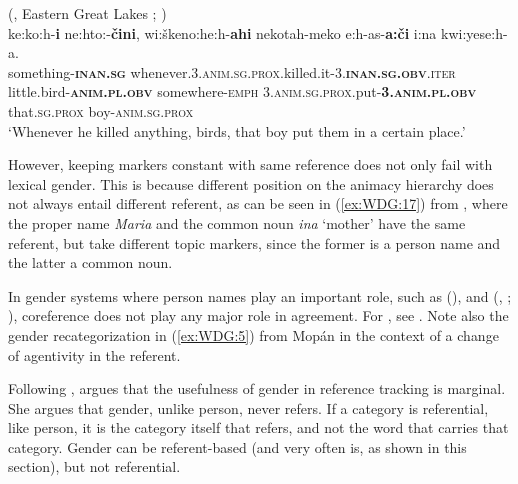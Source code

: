 \documentclass[output=collectionpaper]{langsci/langscibook}
\begin{document}
\ea\label{ex:WDG:16}
 (, Eastern Great Lakes ; \citealt[380]{Thomason2003})\\
\gll ke:ko:h-\textbf{i}	ne:hto:-\textbf{čini}, wi:škeno:he:h-\textbf{ahi} nekotah-meko e:h-as-\textbf{a:či}	i:na	kwi:yese:h-a.\\
something-\textbf{\textsc{inan.sg}}	whenever.3.\textsc{anim.sg.prox}.killed.it-3.\textbf{\textsc{inan.sg.obv}}.\textsc{iter} little.bird-\textbf{\textsc{anim.pl.obv}} 	somewhere-\textsc{emph} 3.\textsc{anim.sg.prox}.put-\textbf{3.\textsc{anim.pl.obv}}	that.\textsc{sg.prox}	boy-\textsc{anim.sg.prox}\\
\glt `Whenever he killed anything, birds, that boy put them in a certain place.'\\
\z

However, keeping markers constant with same reference does not only fail with lexical gender. This is because different position on the animacy hierarchy does not always entail different referent, as can be seen in (\ref{ex:WDG:17}) from , where the proper name \textit{Maria} and the common noun \textit{ina} `mother' have the same referent, but take different topic markers, since the former is a person name and the latter a common noun.

%

In gender systems where person names play an important role, such as  (),  and  (, ; \citealt{Mellow2013}), coreference does not play any major role in agreement. For , see . Note also the gender recategorization in (\ref{ex:WDG:5}) from Mopán  in the context of a change of agentivity in the referent.

Following \cite[334--360]{Kibrik2011},  argues that the usefulness of gender in reference tracking is marginal. She argues that gender, unlike person, never refers. If a category is referential, like person, it is the category itself that refers, and not the word that carries that category. Gender can be referent-based (and very often is, as shown in this section), but not referential.
\end{document}
